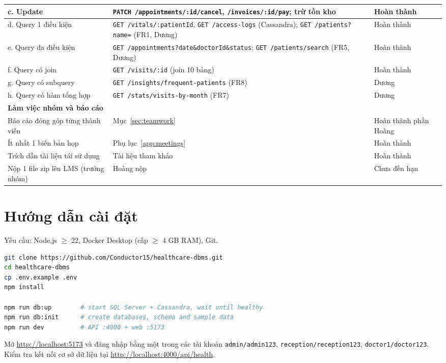 \begin{table}[H]
\begin{tabularx}{\linewidth}{|p{4.4cm}|X|p{2.2cm}|}
c. Update & \texttt{PATCH /appointments/:id/cancel}, \texttt{/invoices/:id/pay}; trừ tồn kho & Hoàn thành \\ \hline
d. Query 1 điều kiện & \texttt{GET /vitals/:patientId}, \texttt{GET /access-logs} (Cassandra); \texttt{GET /patients?name=} (FR1, Dương) & Hoàn thành \\ \hline
e. Query đa điều kiện & \texttt{GET /appointments?date\&doctorId\&status}; \texttt{GET /patients/search} (FR5, Dương) & Hoàn thành \\ \hline
f. Query có join & \texttt{GET /visits/:id} (join 10 bảng) & Hoàn thành \\ \hline
g. Query có subquery & \texttt{GET /insights/frequent-patients} (FR8) & Dương \\ \hline
h. Query có hàm tổng hợp & \texttt{GET /stats/visits-by-month} (FR7) & Dương \\ \hline
\multicolumn{3}{|l|}{\textbf{Làm việc nhóm và báo cáo}} \\ \hline
Báo cáo đóng góp từng thành viên & Mục~\ref{sec:teamwork} & Hoàn thành phần Hoàng \\ \hline
Ít nhất 1 biên bản họp & Phụ lục~\ref{app:meetings} & Hoàn thành \\ \hline
Trích dẫn tài liệu tái sử dụng & Tài liệu tham khảo & Hoàn thành \\ \hline
Nộp 1 file zip lên LMS (trưởng nhóm) & Hoàng nộp & Chưa đến hạn \\ \hline
\end{tabularx}
\end{table}

\section{Hướng dẫn cài đặt}
\label{app:install}
Yêu cầu: Node.js $\geq$ 22, Docker Desktop (cấp $\geq$ 4 GB RAM), Git.

\begin{lstlisting}[language=bash, numbers=none]
git clone https://github.com/Conductor15/healthcare-dbms.git
cd healthcare-dbms
cp .env.example .env
npm install

npm run db:up        # start SQL Server + Cassandra, wait until healthy
npm run db:init      # create databases, schema and sample data
npm run dev          # API :4000 + web :5173
\end{lstlisting}

Mở \url{http://localhost:5173} và đăng nhập bằng một trong các tài khoản \texttt{admin/admin123}, \texttt{reception/reception123}, \texttt{doctor1/doctor123}. Kiểm tra kết nối cơ sở dữ liệu tại \url{http://localhost:4000/api/health}.

